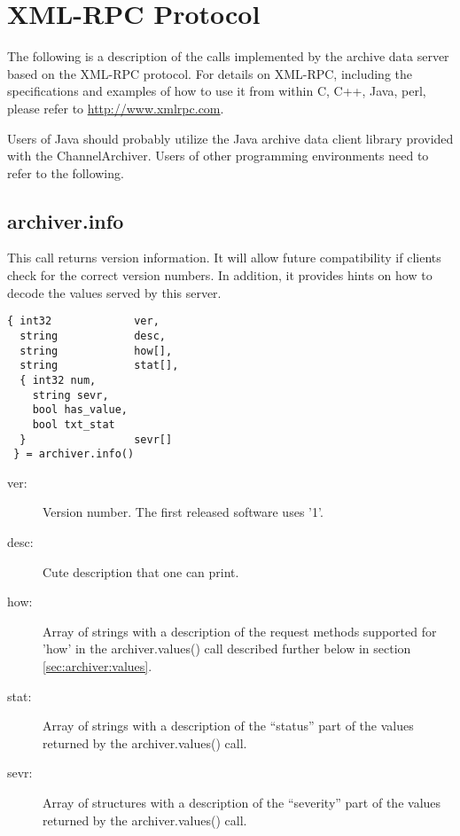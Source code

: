 \section{XML-RPC Protocol} \label{sec:xmlprotocol}
The following is a description of the calls implemented by the archive
data server based on the XML-RPC protocol.
For details on XML-RPC,  including the specifications and examples of
how to use it from within C,  C++, Java, perl, please refer to
\href{http://www.xmlrpc.com}{http://www.xmlrpc.com}.

Users of Java should probably utilize the Java archive data client
library provided with the ChannelArchiver. Users of other programming
environments need to refer to the following.

\subsection{archiver.info} \label{sec:archiver:info} %
This call returns version information. It will allow future
compatibility if clients check for the correct version numbers.  In
addition, it provides hints on how to decode the values served by this
server.

\begin{lstlisting}[keywordstyle=\sffamily]
{ int32             ver,
  string            desc,
  string            how[],
  string            stat[],
  { int32 num,
    string sevr,
    bool has_value,
    bool txt_stat
  }                 sevr[]
 } = archiver.info()
\end{lstlisting}

\begin{description}
\item[\sffamily ver:]  Version number. The first released software uses '1'.
\item[\sffamily desc:] Cute description that one can print.
\item[\sffamily how:]  Array of strings with a description of the
                       request methods supported for 'how' in the
		       archiver.values() call described further below in
                       section \ref{sec:archiver:values}.
\item[\sffamily stat:] Array of strings with a description of the
                       ``status'' part of the values returned by
                       the archiver.values() call.     
\item[\sffamily sevr:] Array of structures with a description of the
                       ``severity'' part of the values returned by
                       the archiver.values() call.     
\end{description}

